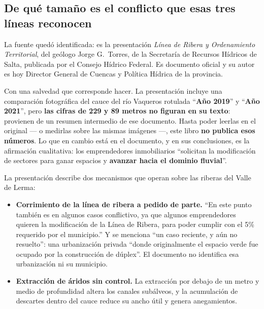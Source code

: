 \subsection*{De qué tamaño es el conflicto que esas tres líneas reconocen}

La fuente quedó identificada: es la presentación \textit{Línea de Ribera y Ordenamiento Territorial}, del geólogo Jorge G.\ Torres, de la Secretaría de Recursos Hídricos de Salta, publicada por el Consejo Hídrico Federal. Es documento oficial y su autor es hoy Director General de Cuencas y Política Hídrica de la provincia.

Con una salvedad que corresponde hacer. La presentación incluye una comparación fotográfica del cauce del río Vaqueros rotulada ``\textbf{Año 2019}'' y ``\textbf{Año 2021}'', pero \textbf{las cifras de 229 y 89 metros no figuran en su texto}: provienen de un resumen intermedio de ese documento. Hasta poder leerlas en el original --- o medirlas sobre las mismas imágenes ---, este libro \textbf{no publica esos números}. Lo que en cambio está en el documento, y en sus conclusiones, es la afirmación cualitativa: los emprendedores inmobiliarios ``solicitan la modificación de sectores para ganar espacios y \textbf{avanzar hacia el dominio fluvial}''.

La presentación describe dos mecanismos que operan sobre las riberas del Valle de Lerma:

\begin{itemize}[leftmargin=*]
\item \textbf{Corrimiento de la línea de ribera a pedido de parte.} ``En este punto también es en algunos casos conflictivo, ya que algunos emprendedores quieren la modificación de la Línea de Ribera, para poder cumplir con el 5\% requerido por el municipio.'' Y se menciona ``un caso reciente, y aún no resuelto'': una urbanización privada ``donde originalmente el espacio verde fue ocupado por la construcción de dúplex''. El documento no identifica esa urbanización ni su municipio.
\item \textbf{Extracción de áridos sin control.} La extracción por debajo de un metro y medio de profundidad altera los canales subálveos, y la acumulación de descartes dentro del cauce reduce su ancho útil y genera anegamientos.
\end{itemize}

